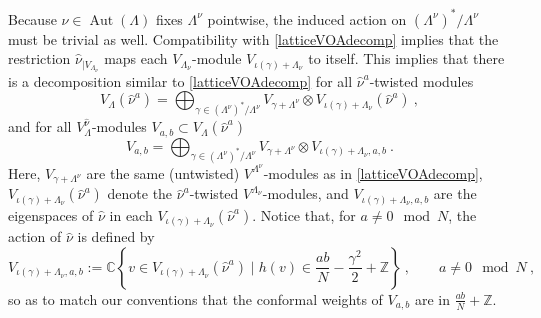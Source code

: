 \documentclass[11pt,reqno]{article}
\newcommand{\be}{\begin{equation}}
\newcommand{\ee}{\end{equation}}
\DeclareMathOperator{\Aut}{Aut}
\newcommand{\ZZ}{\mathbb{Z}}
\newcommand{\CC}{\mathbb{C}}
\begin{document}

Because $\nu\in \Aut(\Lambda)$ fixes $\Lambda^\nu$ pointwise, the induced action on $(\Lambda^\nu)^*/\Lambda^\nu$ must be trivial as well. Compatibility with \eqref{latticeVOAdecomp} implies that the restriction $\hat \nu_{\rvert V_{\Lambda_\nu}}$ maps each $V_{\Lambda_\nu}$-module $V_{\iota(\gamma)+\Lambda_\nu}$ to itself. This implies that there is a decomposition similar to \eqref{latticeVOAdecomp} for all $\hat \nu^a$-twisted modules %
\be V_\Lambda(\hat\nu^a)=\bigoplus_{\gamma\in (\Lambda^\nu)^*/\Lambda^\nu} V_{\gamma+ \Lambda^\nu}\otimes V_{\iota(\gamma)+\Lambda_\nu}(\hat\nu^a)\ ,
\ee and for all $V_\Lambda^{\hat\nu}$-modules $V_{a,b}\subset V_\Lambda(\hat\nu^a)$ 
\be\label{Lambdanudecomp} V_{a,b} = \bigoplus_{\gamma\in (\Lambda^\nu)^*/\Lambda^\nu} V_{\gamma+ \Lambda^\nu}\otimes V_{\iota(\gamma)+\Lambda_\nu,a,b}\ .
\ee
Here, $V_{\gamma+ \Lambda^\nu}$ are the same (untwisted)  $V^{\Lambda^\nu}$-modules as in \eqref{latticeVOAdecomp}, $V_{\iota(\gamma)+\Lambda_\nu}(\hat\nu^a)$  denote the $\hat \nu^a$-twisted $V^{\Lambda_\nu}$-modules, and $V_{\iota(\gamma)+\Lambda_\nu,a,b}$ are the eigenspaces of $\hat\nu$ in each $V_{\iota(\gamma)+\Lambda_\nu}(\hat\nu^a)$.
Notice that, for $a\neq 0\mod N$, the action of $\hat\nu$ is defined by
\be V_{\iota(\gamma)+\Lambda_\nu,a,b}:=\CC\left\{v\in V_{\iota(\gamma)+\Lambda_\nu}(\hat\nu^a)\mid h(v)\in \frac{ab}{N}-\frac{\gamma^2}{2}+\ZZ\right\}\ ,\qquad a\neq 0\mod N\ ,
\ee  so as to match our conventions that the conformal weights of $V_{a,b}$ are in $\frac{ab}{N}+\ZZ$.
\end{document}
